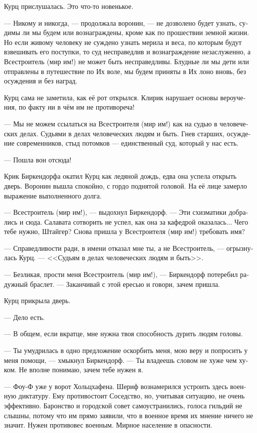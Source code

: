 \documentclass[a4paper,12pt,fleqn]{book}\usepackage{cooltooltips}\usepackage{polyglossia}\setdefaultlanguage[babelshorthands=true]{russian}\setotherlanguage{english}\defaultfontfeatures{Ligatures=TeX,Mapping=tex-text} \usepackage{xcolor}\definecolor{lightgray}{HTML}{bbbbbb}\color{lightgray}\newcommand{\ml}[3]{\textenglish{\textcolor{black}{#3}}}
\newcommand{\asterism}{\vspace{1em}{\centering\Large\bfseries$\ast~\ast~\ast$\par}\vspace{1em}}
\begin{document}
Курц прислушалась.
Это что-то новенькое.

--- Никому и никогда, --- продолжала воронин, --- не дозволено будет узнать, судимы ли мы будем или вознаграждены, кроме как по прошествии земной жизни.
Но если живому человеку не суждено узнать мерила и веса, по которым будут взвешивать его поступки, то суд несправедлив и вознаграждение незаслуженно, а Всестроитель (мир им!) не может быть несправедливы.
Блудные ли мы дети или отправлены в путешествие по Их воле, мы будем приняты в Их лоно вновь, без осуждения и без наград.

Курц сама не заметила, как её рот открылся.
Клирик нарушает основы вероучения, по факту ни в чём им не противореча!

--- Мы не можем ссылаться на Всестроителя (мир им!) как на судью в человеческих делах.
Судьями в делах человеческих людям и быть.
Гнев старших, осуждение современников, стыд потомков --- единственный суд, который у нас есть.

\asterism

--- Пошла вон отсюда!

Крик Биркендорфа окатил Курц как ледяной дождь, едва она успела открыть дверь.
Воронин вышла спокойно, с гордо поднятой головой.
На её лице замерло выражение выполненного долга.

--- Всестроитель (мир им!), --- выдохнул Биркендорф.
--- Эти схизматики добрались и сюда.
Салавата сотворить не успел, как она за кафедрой оказалась...
Чего тебе нужно, Штайгер?
Снова пришла у Всестроителя (мир им!) требовать имя?

--- Справедливости ради, в имени отказал мне ты, а не Всестроитель, --- огрызнулась Курц.
--- <<Судьям в делах человеческих людям и быть>>.

--- Безликая, прости меня Всестроитель (мир им!), --- Биркендорф потеребил радужный браслет.
--- Заканчивай с этой ересью и говори, зачем пришла.

Курц прикрыла дверь.

--- Дело есть.

\asterism

--- В общем, если вкратце, мне нужна твоя способность дурить людям головы.

--- Ты умудрилась в одно предложение оскорбить меня, мою веру и попросить у меня помощи, --- хмыкнул Биркендорф.
--- Ты владеешь словом не хуже чем хуком.
Не вполне понимаю, зачем тебе нужен я.

--- Фоу-Ф уже у ворот Хольцхафена.
Шериф вознамерился устроить здесь военную диктатуру.
Ему противостоит Соседство, но, учитывая ситуацию, не очень эффективно.
Баронство и городской совет самоустранились, голоса гильдий не слышны, потому что им прямо заявили, что в военное время их мнение ничего не значит.
Нужен противовес военным.
Мирное население в опасности.
\end{document}
